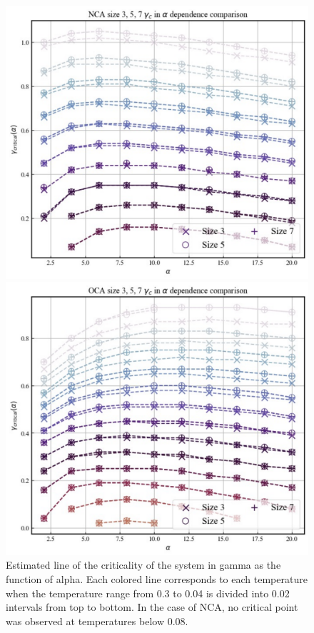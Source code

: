 \documentclass{article}[12pt]
\begin{document}
\begin{spacing}{1.5}
\begin{figure}[htbp]
  \centerline{\includegraphics[width=12cm]{TexFigure/NCA_crit-7.pdf}}
  \centerline{\includegraphics[width=12cm]{TexFigure/OCA_crit-7.pdf}}
  \caption{Estimated line of the criticality of the system in gamma as the function of alpha. 
  Each colored line corresponds to each temperature when the temperature range from 0.3 to 0.04 is divided into 0.02 intervals 
  from top to bottom. In the case of NCA, no critical point was observed at temperatures below 0.08.}
\end{figure}
\pagebreak
\newpage
\end{spacing}
\end{document}
